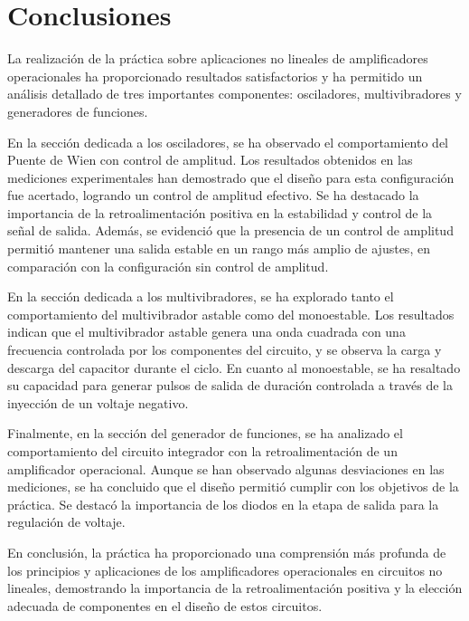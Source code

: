 
\section{Conclusiones}


La realización de la práctica sobre aplicaciones no lineales de amplificadores operacionales ha proporcionado resultados satisfactorios y ha permitido un análisis detallado de tres importantes componentes: osciladores, multivibradores y generadores de funciones.

En la sección dedicada a los osciladores, se ha observado el comportamiento del Puente de Wien con control de amplitud. Los resultados obtenidos en las mediciones experimentales han demostrado que el diseño para esta configuración fue acertado, logrando un control de amplitud efectivo. Se ha destacado la importancia de la retroalimentación positiva en la estabilidad y control de la señal de salida. Además, se evidenció que la presencia de un control de amplitud permitió mantener una salida estable en un rango más amplio de ajustes, en comparación con la configuración sin control de amplitud.

En la sección dedicada a los multivibradores, se ha explorado tanto el comportamiento del multivibrador astable como del monoestable. Los resultados indican que el multivibrador astable genera una onda cuadrada con una frecuencia controlada por los componentes del circuito, y se observa la carga y descarga del capacitor durante el ciclo. En cuanto al monoestable, se ha resaltado su capacidad para generar pulsos de salida de duración controlada a través de la inyección de un voltaje negativo.

Finalmente, en la sección del generador de funciones, se ha analizado el comportamiento del circuito integrador con la retroalimentación de un amplificador operacional. Aunque se han observado algunas desviaciones en las mediciones, se ha concluido que el diseño permitió cumplir con los objetivos de la práctica. Se destacó la importancia de los diodos en la etapa de salida para la regulación de voltaje.

En conclusión, la práctica ha proporcionado una comprensión más profunda de los principios y aplicaciones de los amplificadores operacionales en circuitos no lineales, demostrando la importancia de la retroalimentación positiva y la elección adecuada de componentes en el diseño de estos circuitos.
\newpage